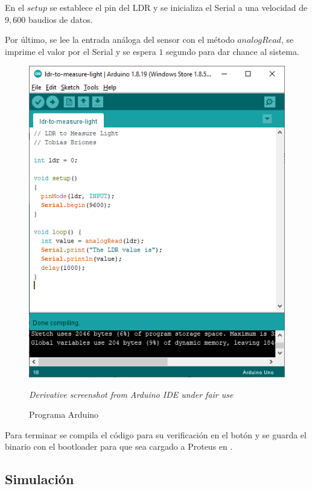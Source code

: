 \documentclass{article}
\begin{document}
\bigbreak

En el $setup$ se establece el pin del LDR y se inicializa el Serial a una velocidad de $9,600$ baudios de datos.

\bigbreak

Por último, se lee la entrada análoga del sensor con el método $analogRead$, se imprime el valor por el Serial y se espera $1$ segundo para dar chance al sistema.

\begin{figure}[H]
\centering
\includegraphics[width=0.3\paperwidth]{images/arduino-sketch.png}
\caption{Programa Arduino}\footnotesize
\textit{Derivative screenshot from Arduino IDE under fair use}
\end{figure}

Para terminar se compila el código para su verificación en el botón  y se guarda el binario con el bootloader para que sea cargado a Proteus en .

\subsection{Simulación}
\end{document}
